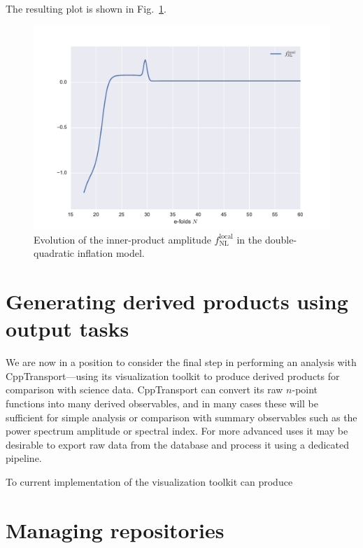 \documentclass[11pt,a4paper]{article}
\newcommand{\fNL}{f_{\mathrm{NL}}}
\newcommand{\fNLlocal}{\fNL^{\text{local}}}
\newcommand{\packagefont}{\sffamily}
\newcommand{\CppTransport}{{\packagefont CppTransport}}
\begin{document}
The resulting plot is shown in Fig.~\ref{fig:dquad-fNL-plot}.
\begin{figure}
    \begin{center}
        \includegraphics[scale=0.65]{Plots/fNL_local}    
    \end{center}
    \caption{\label{fig:dquad-fNL-plot}Evolution of the inner-product
    amplitude $\fNLlocal$ in the double-quadratic inflation model.}
\end{figure}

\section{Generating derived products using output tasks}
\label{sec:derived-products}

We are now in a position to consider the final step in
performing an analysis with {\CppTransport}---using its visualization
toolkit to produce derived products for comparison with science data.
{\CppTransport} can convert its raw $n$-point functions into many
derived observables, and in many cases these will be sufficient
for simple analysis or comparison with summary
observables such as the power spectrum amplitude or spectral index.
For more advanced uses it may be
desirable to export raw data from the database
and process it using a dedicated pipeline.

To current implementation of the visualization toolkit can produce 

\section{Managing repositories}
\label{sec:repo-management}
\end{document}
